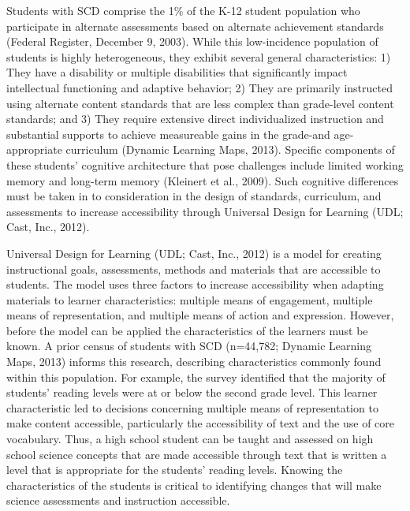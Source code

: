 \documentclass[11.5pt]{sig-alternate} %
\begin{document}
\begin{large}
Students with SCD comprise the 1\% of the K-12 student population who participate in alternate assessments based on alternate achievement standards (Federal Register, December 9, 2003). While this low-incidence population of students is highly heterogeneous, they exhibit several general characteristics: 1) They have a disability or multiple disabilities that significantly impact intellectual functioning and adaptive behavior; 2) They are primarily instructed using alternate content standards that are less complex than grade-level content standards; and 3) They require extensive direct individualized instruction and substantial supports to achieve measureable gains in the grade-and age-appropriate curriculum (Dynamic Learning Maps, 2013). Specific components of these students' cognitive architecture that pose challenges include limited working memory and long-term memory (Kleinert et al., 2009).  Such cognitive differences must be taken in to consideration in the design of standards, curriculum, and assessments to increase accessibility through Universal Design for Learning (UDL; Cast, Inc., 2012). 

Universal Design for Learning (UDL; Cast, Inc., 2012) is a model for creating instructional goals, assessments, methods and materials that are accessible to students. The model uses three factors to increase accessibility when adapting materials to learner characteristics: multiple means of engagement, multiple means of representation, and multiple means of action and expression. However, before the model can be applied the characteristics of the learners must be known. A prior census of students with SCD (n=44,782; Dynamic Learning Maps, 2013) informs this research, describing characteristics commonly found within this population. For example, the survey identified that the majority of students' reading levels were at or below the second grade level. This learner characteristic led to decisions concerning multiple means of representation to make content accessible, particularly the accessibility of text and the use of core vocabulary. Thus, a high school student can be taught and assessed on high school science concepts that are made accessible through text that is written a level that is appropriate for the students' reading levels. Knowing the characteristics of the students is critical to identifying changes that will make science assessments and instruction accessible. 


\end{large}
\end{document}
